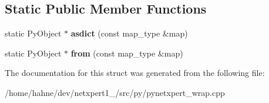 \subsection*{Static Public Member Functions}
\begin{DoxyCompactItemize}
\item 
static Py\+Object $\ast$ {\bfseries asdict} (const map\+\_\+type \&map)\hypertarget{structswig_1_1traits__from_3_01std_1_1map_3_01K_00_01T_00_01Compare_00_01Alloc_01_4_01_4_a27e1b651c802e7e0cd31e835da1158f1}{}\label{structswig_1_1traits__from_3_01std_1_1map_3_01K_00_01T_00_01Compare_00_01Alloc_01_4_01_4_a27e1b651c802e7e0cd31e835da1158f1}

\item 
static Py\+Object $\ast$ {\bfseries from} (const map\+\_\+type \&map)\hypertarget{structswig_1_1traits__from_3_01std_1_1map_3_01K_00_01T_00_01Compare_00_01Alloc_01_4_01_4_a215ce375f295de427bb6a6b51862ca7c}{}\label{structswig_1_1traits__from_3_01std_1_1map_3_01K_00_01T_00_01Compare_00_01Alloc_01_4_01_4_a215ce375f295de427bb6a6b51862ca7c}

\end{DoxyCompactItemize}


The documentation for this struct was generated from the following file\+:\begin{DoxyCompactItemize}
\item 
/home/hahne/dev/netxpert1\+\_/src/py/pynetxpert\+\_\+wrap.\+cpp\end{DoxyCompactItemize}
